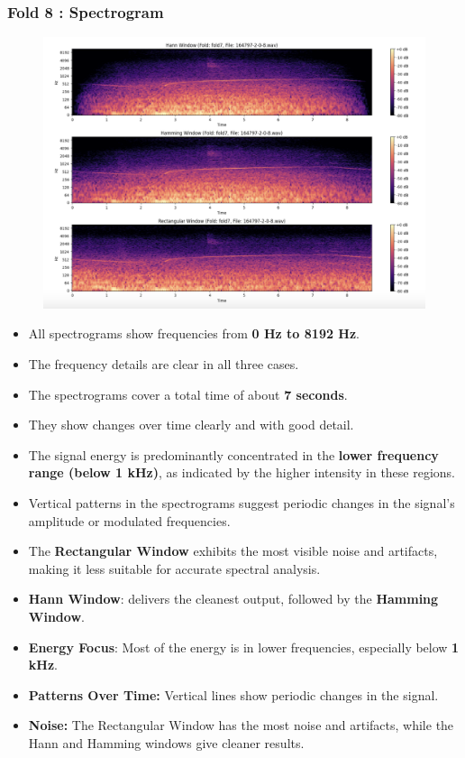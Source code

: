 \documentclass[a4paper,12pt]{article}
\begin{document}
    \subsubsection{Fold 8 : Spectrogram}
    \begin{figure}[H]
        \centering
        \includegraphics[width=1\linewidth]{Fold8.png}
    \end{figure}
    \begin{itemize}
        \item All spectrograms show frequencies from  \textbf{0 Hz to 8192 Hz}.
        \item The frequency details are clear in all three cases.
        \item The spectrograms cover a total time of about  \textbf{7 seconds}.
        \item They show changes over time clearly and with good detail.
        \item The signal energy is predominantly concentrated in the \textbf{lower frequency range (below 1 kHz)}, as indicated by the higher intensity in these regions.
        \item Vertical patterns in the spectrograms suggest periodic changes in the signal's amplitude or modulated frequencies.
        \item The \textbf{Rectangular Window} exhibits the most visible noise and artifacts, making it less suitable for accurate spectral analysis.
        \item \textbf{Hann Window}: delivers the cleanest output, followed by the \textbf{Hamming Window}.
        \item \textbf{Energy Focus}: Most of the energy is in lower frequencies, especially below \textbf{1 kHz}.
        \item \textbf{Patterns Over Time:} Vertical lines show periodic changes in the signal.
        \item \textbf{Noise:} The Rectangular Window has the most noise and artifacts, while the Hann and Hamming windows give cleaner results.
    \end{itemize}
\newpage
\end{document}
